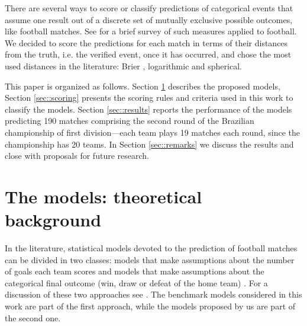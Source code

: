 \documentclass[journal,article,accept,moreauthors,pdftex,12pt,a4paper]{mdpi}
\begin{document}
	
	
	
	There are several ways to score or classify predictions of categorical events that assume one result out of a discrete set of mutually exclusive possible outcomes, like football matches.
	See \cite{constantinou} for a brief survey of such measures applied to football.
	We decided to score the predictions for each match in terms of their distances from the truth, i.e. the verified event, once it has occurred, and chose the most used distances in the literature: Brier \cite{brier1950}, logarithmic and spherical.
	
	This paper is organized as follows.
	Section \ref{sec::experimental} describes the proposed models, Section \ref{sec::scoring} presents the scoring rules and criteria used in this work to classify the models.
	Section \ref{sec::results} reports the performance of the models predicting 190 matches comprising the second round of the Brazilian championship of first division---each team plays 19 matches each round, since the championship has 20 teams.
	In Section \ref{sec::remarks} we discuss the results and close with proposals for future research.
	
	
	
	\section{The models: theoretical background}
	\label{sec::experimental}
	
	In the literature, statistical models devoted to the prediction of
	football matches can be divided in two classes: models that make
	assumptions about the number of goals each team scores
	\citep{Maher82, Dixon97, Lee97, Karlis2003} and models that make
	assumptions about the categorical final outcome (win, draw or defeat
	of the home team) \citep{Forrest2000, Koning2000, Brillinger2008,
		Brillinger2009}. For a discussion of these two approaches see
	\cite{Goddard2005}. The benchmark models considered in this work are
	part of the first approach, while the models proposed by us are part
	of the second one.
	
\end{document}
